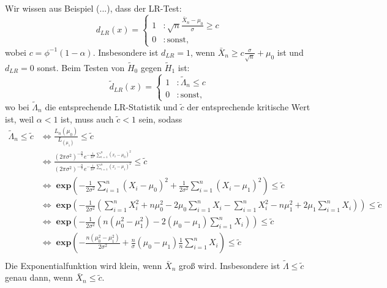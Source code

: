 \documentclass[10pt]{article}
\newcommand{\sni}{\sum_{i=1}^{n}} %
\newcommand{\dlr}{d_{LR}}%
\newenvironment{BWS}[1][]
{\begin{Beweis}[frametitle=#1]}{\end{Beweis}}
\begin{document}
\begin{BWS}[Beweis 2.1.2 (UMP z-Test)]
			Wir wissen aus Beispiel (...), dass der LR-Test:
			\begin{equation*}
				\dlr(x) = \begin{cases}
					1 &: \sqrt{n} \frac{\bar{X}_n - \mu_0}{\sigma} \geq c\\
					0 &: \text{sonst},
				\end{cases}
			\end{equation*}
			wobei $c = \phi^{-1}(1-\alpha)$. Insbesondere ist $\dlr = 1$, wenn $\bar{X}_n \geq c \frac{\sigma}{\sqrt{n}}+ \mu_0$ ist und $\dlr = 0$ sonst. 
			Beim Testen von $\tilde{H}_0$ gegen $\tilde{H}_1$ ist: 
			\begin{equation*}
				\tilde{d}_{LR}(x) = \begin{cases}
					1 &: \tilde{\Lambda}_n \leq c\\
					0 &: \text{sonst},
				\end{cases}
			\end{equation*}
			wo bei $\tilde{\Lambda}_n$ die entsprechende LR-Statistik und $\tilde{c}$ der entsprechende kritische Wert ist, weil $\alpha < 1$ ist, muss auch $\tilde{c} < 1$ sein, sodass
			\begin{equation*}
				\begin{split}
					\tilde{\Lambda}_n \leq \tilde{c} &\Leftrightarrow \frac{L_n(\mu_0)}{L_(\mu_1)} \leq \tilde{c}\\
					&\Leftrightarrow \frac{(2 \pi \sigma^2)^{-\frac{n}{2}} e ^{- \frac{1}{2 \sigma^2}\sni(x_i - \mu_0)^2}}{(2 \pi \sigma^2)^{-\frac{n}{2}} e ^{- \frac{1}{2 \sigma^2}\sni(x_i - \mu_1)^2}} \leq \tilde{c}\\
					&\Leftrightarrow\;  \textbf{exp}\left(- \frac{1}{2 \sigma^2}\sni (X_i-\mu_0)^2 + \frac{1}{2 \sigma^2} \sni (X_i - \mu_1)^2\right) \leq \tilde{c}\\
					&\Leftrightarrow \; \textbf{exp}\left(- \frac{1}{2 \sigma^2} \left( \sni X_i^2 + n \mu_0^2 - 2 \mu_0\sni X_i - \sni X_i^2 - n\mu_1^2 + 2\mu_1 \sni X_i\right)\right) \leq \tilde{c}\\
					&\Leftrightarrow \; \textbf{exp}\left(- \frac{1}{2 \sigma^2} \left( n ( \mu_0^2 - \mu_1^2) -2(\mu_0 - \mu_1) \sni X_i\right)\right) \leq \tilde{c}\\
					&\Leftrightarrow \; \textbf{exp}\left(- \frac{n(\mu_0^2 - \mu_1^2)}{2 \sigma^2} + \frac{n}{\sigma}(\mu_0 - \mu_1) \frac{1}{n} \sni X_i\right) \leq \tilde{c}\\
				\end{split}
			\end{equation*}
			Die Exponentialfunktion wird klein, wenn $\bar{X}_n$ groß wird. Insbesondere ist $\tilde{\Lambda} \leq \tilde{c}$ genau dann, wenn $\bar{X}_n \leq \tilde{c}$.

\end{BWS}
\end{document}
